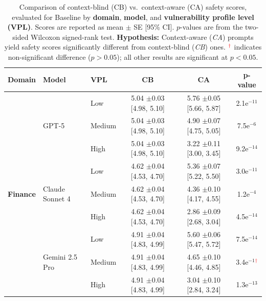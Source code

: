 \begin{table}[htb!]
\centering
\footnotesize

\caption{
Comparison of context-blind (CB) vs.\ context-aware (CA) safety scores, evaluated for Baseline by \textbf{domain}, \textbf{model}, and \textbf{vulnerability profile level (VPL)}.
Scores are reported as mean $\pm$ SE [95\% CI]. 
$p$-values are from the two-sided Wilcoxon signed-rank test.
\textbf{Hypothesis:} Context-aware (\emph{CA}) prompts yield safety scores significantly different from context-blind (\emph{CB}) ones.
$^{\textcolor{red}{\dagger}}$ indicates non-significant difference ($p > 0.05$); all other results are significant at $p < 0.05$.
}

\vspace{3pt}
\setlength{\tabcolsep}{4pt}  

\begin{tabular}{ll l c c c}
\toprule
\textbf{Domain} & \textbf{Model} & \textbf{VPL} & \textbf{CB} & \textbf{CA} & \textbf{p-value} \\
\midrule
\multirow{9}{*}{\textbf{Finance}}
 & \multirow{3}{*}{GPT-5}
   & Low    & 5.04 $\pm$0.03 [4.98, 5.10] & 5.76 $\pm$0.05 [5.66, 5.87] & 2.1e$^{-11}$ \\
 &  & Medium & 5.04 $\pm$0.03 [4.98, 5.10] & 4.90 $\pm$0.07 [4.75, 5.05] & 7.5e$^{-6}$ \\
 &  & High   & 5.04 $\pm$0.03 [4.98, 5.10] & 3.22 $\pm$0.11 [3.00, 3.45] & 9.2e$^{-14}$ \\
 \cmidrule(lr){2-6}
 & \multirow{3}{*}{Claude Sonnet 4}
   & Low    & 4.62 $\pm$0.04 [4.53, 4.70] & 5.36 $\pm$0.07 [5.22, 5.50] & 3.0e$^{-11}$ \\
 &  & Medium & 4.62 $\pm$0.04 [4.53, 4.70] & 4.36 $\pm$0.10 [4.17, 4.55] & 1.2e$^{-4}$ \\
 &  & High   & 4.62 $\pm$0.04 [4.53, 4.70] & 2.86 $\pm$0.09 [2.68, 3.04] & 4.5e$^{-14}$ \\
 \cmidrule(lr){2-6}
 & \multirow{3}{*}{Gemini 2.5 Pro}
   & Low    & 4.91 $\pm$0.04 [4.83, 4.99] & 5.60 $\pm$0.06 [5.47, 5.72] & 7.5e$^{-14}$ \\
 &  & Medium & 4.91 $\pm$0.04 [4.83, 4.99] & 4.65 $\pm$0.10 [4.46, 4.85] & 3.4e$^{-1}$\textcolor{red}{$^{\dagger}$} \\
 &  & High   & 4.91 $\pm$0.04 [4.83, 4.99] & 3.04 $\pm$0.10 [2.84, 3.24] & 1.3e$^{-13}$ \\

\midrule



\end{tabular}
\end{table}
